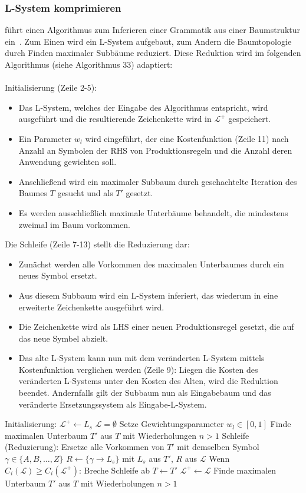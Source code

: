 \subsubsection*{L-System komprimieren}
\citeauthor{guo_2020} führt einen Algorithmus zum Inferieren einer Grammatik aus einer Baumstruktur ein~\cite{guo_2020}.
Zum Einen wird ein L-System aufgebaut, zum Andern die Baumtopologie durch Finden maximaler Subbäume reduziert.
Diese Reduktion wird im folgenden Algorithmus (siehe Algorithmus 33) adaptiert:\\~\\
Initialisierung (Zeile 2-5):
\begin{itemize}
    \item Das L-System, welches der Eingabe des Algorithmus entspricht, wird ausgeführt und
    die resultierende Zeichenkette wird in $\mathcal{L^+}$ gespeichert.
    \item Ein Parameter $w_l$ wird eingeführt, der eine Kostenfunktion (Zeile 11) nach Anzahl an Symbolen
    der RHS von Produktionsregeln und die Anzahl deren Anwendung gewichten soll.
    \item Anschließend wird ein maximaler Subbaum durch geschachtelte Iteration des Baumes $T$ gesucht und als $T'$ gesetzt.
    \item Es werden ausschließlich maximale Unterbäume behandelt, die mindestens zweimal im Baum vorkommen.
\end{itemize}
Die Schleife (Zeile 7-13) stellt die Reduzierung dar:
\begin{itemize}
    \item Zunächst werden alle Vorkommen des maximalen Unterbaumes durch ein neues Symbol ersetzt.
    \item Aus diesem Subbaum wird ein L-System inferiert, das wiederum in eine erweiterte Zeichenkette ausgeführt wird.
    \item Die Zeichenkette wird als LHS einer neuen Produktionsregel gesetzt, die auf das neue Symbel abzielt.
    \item Das alte L-System kann nun mit dem veränderten L-System mittels Kostenfunktion verglichen werden (Zeile 9):
    Liegen die Kosten des veränderten L-Systems unter den Kosten des Alten, wird die Reduktion beendet.
    Andernfalls gilt der Subbaum nun als Eingabebaum und das veränderte Ersetzungssystem als Eingabe-L-System.
\end{itemize}

\begin{algorithm}[caption={Erstellen eines kompakten L-Systems mit Gewichtung $w_l$}, label={alg3}]
Initialisierung:
    $\mathcal{L}^+ \leftarrow L_s$
    $\mathcal{L}=\emptyset$
    Setze Gewichtungsparameter $w_l \in [0,1]$
    Finde maximalen Unterbaum $T'$ aus $T$ mit Wiederholungen $n>1$
Schleife (Reduzierung):
    Ersetze alle Vorkommen von $T'$ mit demselben Symbol $\gamma \in \{A,B,\dots,Z\}$
    $R \leftarrow \{\gamma \rightarrow L_s\}$ mit $L_s$ aus $T'$, $R$ aus $\mathcal{L}$
    Wenn $C_i(\mathcal{L}) \geq C_i(\mathcal{L}^+)$:
        Breche Schleife ab
    $T \leftarrow T'$
    $\mathcal{L}^+ \leftarrow \mathcal{L}$
    Finde maximalen Unterbaum $T'$ aus $T$ mit Wiederholungen $n>1$
\end{algorithm}

